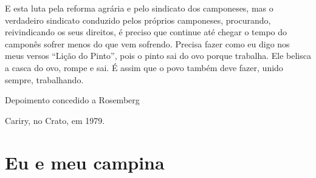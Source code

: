 E esta luta pela reforma agrária e pelo sindicato dos camponeses, mas o
verdadeiro sindicato conduzido pelos próprios camponeses, procurando,
reivindicando os seus direitos, é preciso que continue até chegar o
tempo do camponês sofrer menos do que vem sofrendo. Precisa fazer como
eu digo nos meus versos ``Lição do Pinto'', pois o pinto sai do ovo
porque trabalha. Ele belisca a casca do ovo, rompe e sai. É assim que o
povo também deve fazer, unido sempre, trabalhando.

\hfill{}Depoimento concedido a Rosemberg

\hfill{}Cariry, no Crato, em 1979.

\chapter{Eu e meu campina}

